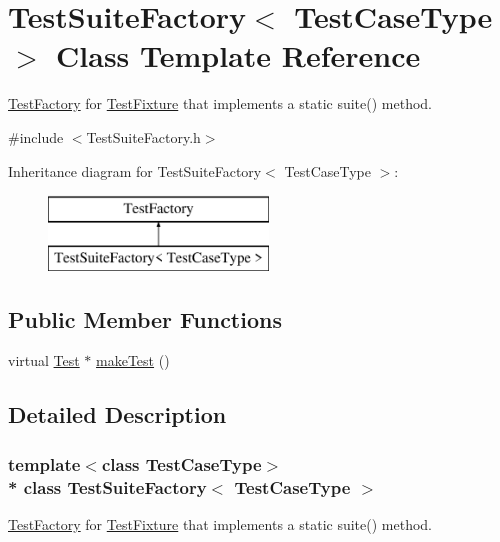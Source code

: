 \hypertarget{class_test_suite_factory}{}\section{Test\+Suite\+Factory$<$ Test\+Case\+Type $>$ Class Template Reference}
\label{class_test_suite_factory}


\hyperlink{class_test_factory}{Test\+Factory} for \hyperlink{class_test_fixture}{Test\+Fixture} that implements a static suite() method.  




{\ttfamily \#include $<$Test\+Suite\+Factory.\+h$>$}

Inheritance diagram for Test\+Suite\+Factory$<$ Test\+Case\+Type $>$\+:\begin{figure}[H]
\begin{center}
\leavevmode
\includegraphics[height=2.000000cm]{class_test_suite_factory}
\end{center}
\end{figure}
\subsection*{Public Member Functions}
\begin{DoxyCompactItemize}
\item 
virtual \hyperlink{class_test}{Test} $\ast$ \hyperlink{class_test_suite_factory_a0790b11de1543fa894acd7069fd1f327}{make\+Test} ()
\end{DoxyCompactItemize}


\subsection{Detailed Description}
\subsubsection*{template$<$class Test\+Case\+Type$>$\\*
class Test\+Suite\+Factory$<$ Test\+Case\+Type $>$}

\hyperlink{class_test_factory}{Test\+Factory} for \hyperlink{class_test_fixture}{Test\+Fixture} that implements a static suite() method. 

